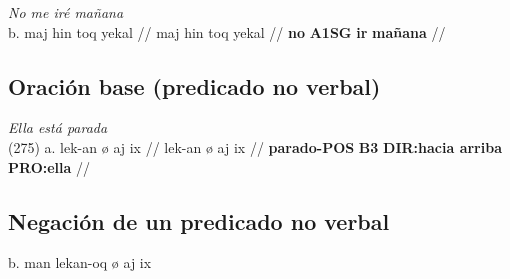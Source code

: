 \documentclass{article}%
\begin{document}
%
\par\medskip%
\ex
\textit{No me iré mañana} \\
\begingl
\gla b. maj hin toq yekal //
\glb maj hin toq yekal //
\glc \textbf{no} \textbf{A1SG} \textbf{ir} \textbf{mañana} //
\endgl
\xe
%
\medskip%
\subsection{Oración base (predicado no verbal)}%
\label{subsec:Oracinbase(predicadonoverbal)}%

%
\par\medskip%
\ex
\textit{Ella está parada} \\
\begingl
\gla (275) a. lek-an ø aj ix //
\glb lek-an ø aj ix //
\glc \textbf{parado-}\textbf{POS} \textbf{B3} \textbf{DIR:hacia arriba} \textbf{PRO:ella} //
\endgl
\xe
%
\medskip%
\subsection{Negación de un predicado no verbal}%
\label{subsec:Negacindeunpredicadonoverbal}%

%
b. man lekan{-}oq ø aj ix 

%
\end{document}
